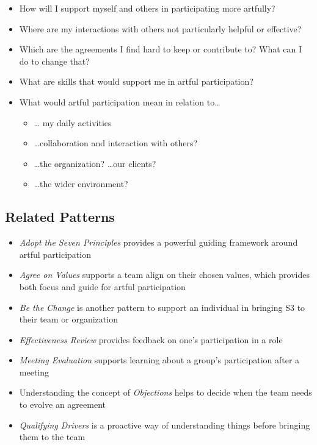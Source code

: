 \begin{itemize}
\item How will I support myself and others in participating more artfully?

\item Where are my interactions with others not particularly helpful or effective?

\item Which are the agreements I find hard to keep or contribute to? What can I do to change that?

\item What are skills that would support me in artful participation?

\item What would artful participation mean in relation to{\ldots}

\begin{itemize}
\item {\ldots} my daily activities

\item {\ldots}collaboration and interaction with others?

\item {\ldots}the organization? {\ldots}our clients?

\item {\ldots}the wider environment?

\end{itemize}

\end{itemize}

\subsection{Related Patterns}
\label{relatedpatterns}

\begin{itemize}
\item \emph{Adopt the Seven Principles} provides a powerful guiding framework around artful participation

\item \emph{Agree on Values} supports a team align on their chosen values, which provides both focus and guide for artful participation

\item \emph{Be the Change} is another pattern to support an individual in bringing S3 to their team or organization

\item \emph{Effectiveness Review} provides feedback on one's participation in a role

\item \emph{Meeting Evaluation} supports learning about a group's participation after a meeting

\item Understanding the concept of \emph{Objections} helps to decide when the team needs to evolve an agreement

\item \emph{Qualifying Drivers} is a proactive way of understanding things before bringing them to the team

\end{itemize}

